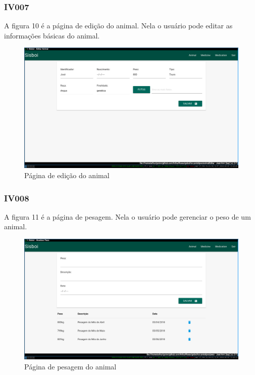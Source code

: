 \documentclass[12pt]{article}
\begin{document}
\newpage
\subsubsection{IV007}

A figura 10 é a página de edição do animal. Nela o usuário pode editar as informações básicas do animal.
\begin{figure}[!h]
	\begin{center}
		\caption{Página de edição do animal}
		\includegraphics[width=13cm]{img/prototipos/editar.png}


	\end{center}
\end{figure}

\subsubsection{IV008}

A figura 11 é a página de pesagem. Nela o usuário pode gerenciar o peso de um animal.
\begin{figure}[!h]
	\begin{center}
		\caption{Página de pesagem do animal}
		\includegraphics[width=13cm]{img/prototipos/peso.png}


	\end{center}
\end{figure}
\end{document}
